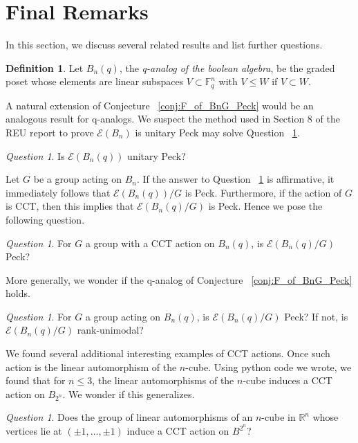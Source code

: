 \documentclass[smallextended, envcountsame, numbook]{svjour3}
\theoremstyle{plain}
\theoremstyle{definition}
\newtheorem{defn}[thm]{Definition}
\theoremstyle{remark}
\newtheorem{que}[thm]{Question}
\numberwithin{equation}{section}
\begin{document}
\section{Final Remarks}

In this section, we discuss several related results and list further questions. 

\begin{defn}
Let $B_n(q)$, the {\it q-analog of the boolean algebra}, be the graded poset whose elements are linear subspaces $V \subset \mathbb F_q^n$ with $V \leq W$ if $V \subset W$.
\end{defn}

A natural extension of Conjecture ~\ref{conj:F_of_BnG_Peck} would be an analogous result for q-analogs. We suspect the method used in Section 8 of the REU report to prove $\mathcal E(B_n)$ is unitary Peck may solve Question ~\ref{question:unitary_peck_q_edge}.

\begin{que}
\label{question:unitary_peck_q_edge}
Is $\mathcal E(B_n(q))$ unitary Peck?
\end{que}


Let $G$ be a group acting on $B_n$.  If the answer to Question ~\ref{question:unitary_peck_q_edge} is affirmative, it immediately follows that $\mathcal E(B_n(q))/G$ is Peck.  Furthermore, if the action of $G$ is CCT, then this implies that $\mathcal E(B_n(q)/G)$ is Peck. Hence we pose the following question.

\begin{que}
For $G$ a group with a CCT action on $B_n(q)$, is $\mathcal E(B_n(q)/G)$ Peck?
\end{que}

More generally, we wonder if the q-analog of Conjecture ~\ref{conj:F_of_BnG_Peck} holds.

\begin{que}
For $G$ a group acting on $B_n(q)$, is $\mathcal E(B_n(q)/G)$ Peck? If not, is $\mathcal E(B_n(q)/G)$ rank-unimodal?
\end{que}

We found several additional interesting examples of CCT actions. Once such action is the linear automorphism of the $n$-cube. Using python code we wrote, we found that for $n \leq 3$, the linear automorphisms of the $n$-cube induces a CCT action on $B_{2^n}$. We wonder if this generalizes.

\begin{que}
\label{question:cube_cct}
Does the group of linear automorphisms of an $n$-cube in $\mathbb R^n$ whose vertices lie at $(\pm 1, \ldots, \pm 1)$ induce a CCT action on $B^{2^n}$?
\end{que}
\end{document}
